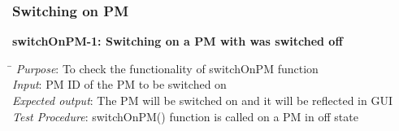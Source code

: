 \documentclass[a4paper,10pt]{article}
\begin{document}
\subsubsection{Switching on PM}
\textbf{switchOnPM-1: Switching on a PM with was switched off}
\begin{tabbing}
  \hspace*{4cm}\= \kill
\emph{Purpose}\>: To check the functionality of switchOnPM function\\
\emph{Input}\>: PM ID of the PM to be switched on\\
\emph{Expected output}\>: The PM will be switched on and it will be reflected in GUI\\
\emph{Test Procedure}\>: switchOnPM() function is called on a PM in off state\\
\end{tabbing}
\end{document}
